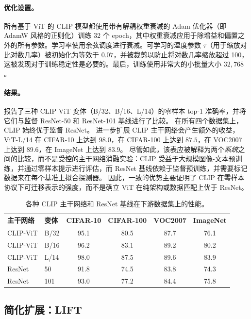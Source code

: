 \documentclass[../../book-main_zh.tex]{subfiles}
\begin{document}
\paragraph{优化设置。}
所有基于 ViT 的 CLIP 模型都使用带有解耦权重衰减的 Adam 优化器（即 AdamW 风格的正则化）训练 32 个 epoch，其中权重衰减应用于除增益和偏置之外的所有参数。学习率使用余弦调度进行衰减。可学习的温度参数 \(\tau\)（用于缩放对比对数几率）被初始化为等效于 \(0.07\)，并被裁剪以防止将对数几率缩放超过 100，这被发现对于训练稳定性是必要的。最后，训练使用非常大的小批量大小 \(32{,}768\)。

\paragraph{结果。} 报告了三种 CLIP ViT 变体（B/32、B/16、L/14）的零样本 top-1 准确率，并将它们与监督 ResNet-50 和 ResNet-101 基线进行了比较。
在所有四个数据集上，CLIP 始终优于监督 ResNet。
进一步扩展 CLIP 主干网络会产生额外的收益，ViT-L/14 在 CIFAR-10 上达到 \(98.0\)，在 CIFAR-100 上达到 \(87.5\)，在 VOC2007 上达到 \(89.6\)，在 ImageNet 上达到 \(83.9\)。
尽管如此，该表应被解释为两个\emph{系统}之间的比较，而不是受控的主干网络消融实验：CLIP 受益于大规模图像-文本预训练，并通过零样本提示进行评估，而 ResNet 基线依赖于监督预训练，并需要标记数据来在每个基准上拟合探测器。
因此，一致的优势主要证明了 CLIP 在零样本协议下可迁移表示的强度，而不是确立 ViT 在纯架构或数据匹配上优于 ResNet。

\begin{table}[t]
\centering
\begin{tabular}{@{}llcccc@{}}
\toprule
主干网络 & 变体 & CIFAR-10 & CIFAR-100 & VOC2007 & ImageNet \\
\midrule
CLIP-ViT & B/32 & 95.1 & 80.5 & 87.7 & 76.1 \\
CLIP-ViT & B/16 & 96.2 & 83.1 & 89.2 & 80.2 \\
CLIP-ViT & L/14 & 98.0 & 87.5 & 89.6 & 83.9 \\
\midrule
ResNet & 50  & 91.8 & 74.5 & 83.8 & 74.3 \\
ResNet & 101 & 93.0 & 77.2 & 84.4 & 75.8 \\
\bottomrule
\end{tabular}
\caption{各种 CLIP 主干网络和 ResNet 基线在下游数据集上的性能。}
\label{tab:clip_vs_resnet}
\end{table}

\subsection{简化扩展：LIFT}\label{sub:follow-up}
\end{document}
